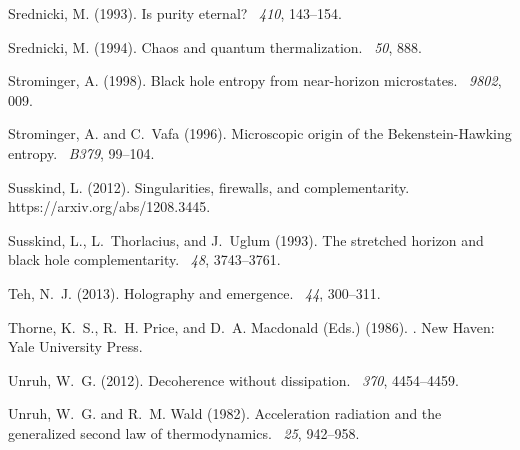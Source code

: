 \documentclass{article}
\begin{document}
\begin{thebibliography}{}
Srednicki, M. (1993).
\newblock Is purity eternal?
~{\em 410}, 143--154.

Srednicki, M. (1994).
\newblock Chaos and quantum thermalization.
~{\em 50}, 888.

Strominger, A. (1998).
\newblock Black hole entropy from near-horizon microstates.
~{\em 9802}, 009.

Strominger, A. and C.~Vafa (1996).
\newblock Microscopic origin of the {B}ekenstein-{H}awking entropy.
~{\em B379}, 99--104.

Susskind, L. (2012).
\newblock Singularities, firewalls, and complementarity.
\newblock https://arxiv.org/abs/1208.3445.

Susskind, L., L.~Thorlacius, and J.~Uglum (1993).
\newblock The stretched horizon and black hole complementarity.
~{\em 48}, 3743--3761.

Teh, N.~J. (2013).
\newblock Holography and emergence.
~{\em 44},
  300--311.

Thorne, K.~S., R.~H. Price, and D.~A. Macdonald (Eds.) (1986).
.
\newblock New Haven: Yale University Press.

Unruh, W.~G. (2012).
\newblock Decoherence without dissipation.
~{\em 370}, 4454--4459.

Unruh, W.~G. and R.~M. Wald (1982).
\newblock Acceleration radiation and the generalized second law of
  thermodynamics.
~{\em 25}, 942--958.


\end{thebibliography}
\end{document}
